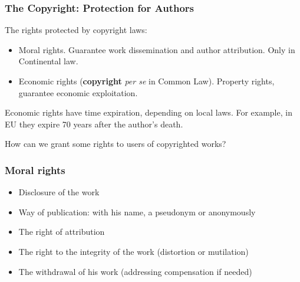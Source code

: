 
%
%
%


\begin{frame}
\frametitle{The Copyright: Protection for Authors}

The rights protected by copyright laws:
\begin{itemize}
\item \alert{Moral rights}. Guarantee work dissemination and author attribution.
Only in Continental law.
\item \alert{Economic rights} (\textbf{copyright} \textit{per se} in Common Law). Property rights, guarantee economic exploitation.
\end{itemize}

Economic rights have time expiration, depending on local laws. For
example, in EU they expire 70 years after the author's death.

\begin{center}
{\large How can we grant some rights to users of copyrighted works?}
\end{center}

\end{frame}


\begin{frame}
\frametitle{Moral rights}

\begin{itemize}
\item Disclosure of the work
\item Way of publication: with his name, a pseudonym or anonymously
\item The right of attribution
\item The right to the integrity of the work (distortion or mutilation)
\item The withdrawal of his work (addressing compensation if needed)
\end{itemize}

\end{frame}

